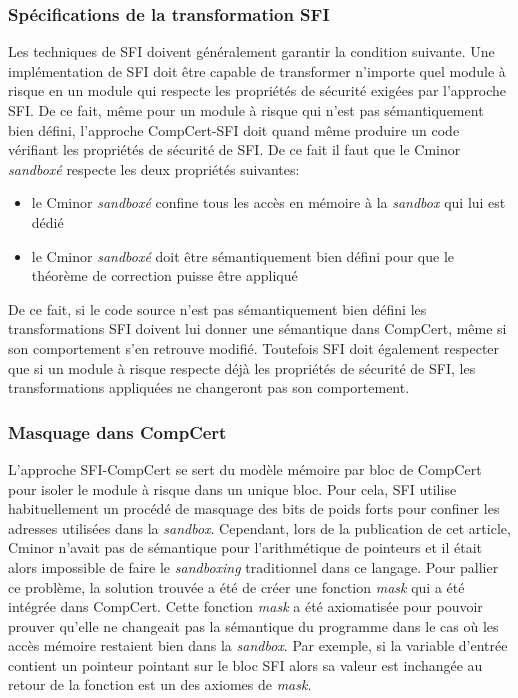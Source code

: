 \documentclass[11pt]{sdm}
\begin{document}
\subsubsection{Spécifications de la transformation SFI}

Les techniques de SFI doivent généralement garantir la condition suivante. Une implémentation de SFI doit être capable de transformer n'importe quel module à risque en un module qui respecte les propriétés de sécurité exigées par l'approche SFI. De ce fait, même pour un module à risque qui n'est pas sémantiquement bien défini, l'approche CompCert-SFI doit quand même produire un code vérifiant les propriétés de sécurité de SFI.
 De ce fait il faut que le Cminor \textit{sandboxé} respecte les deux propriétés suivantes:
\begin{itemize}
	\item le Cminor \textit{sandboxé} confine tous les accès en mémoire à la \textit{sandbox} qui lui est dédié
	\item le Cminor \textit{sandboxé} doit être sémantiquement bien défini pour que le théorème de correction puisse être appliqué
\end{itemize}

De ce fait, si le code source n'est pas sémantiquement bien défini les transformations SFI doivent lui donner une sémantique dans CompCert, même si son comportement s'en retrouve modifié. Toutefois SFI doit également respecter que si un module à risque respecte déjà les propriétés de sécurité de SFI, les transformations appliquées ne changeront pas son comportement.


\subsubsection{Masquage dans CompCert}

L'approche SFI-CompCert se sert du modèle mémoire par bloc de CompCert pour isoler le module à risque dans un unique bloc. Pour cela, SFI utilise habituellement un procédé de masquage des bits de poids forts pour confiner les adresses utilisées dans la \textit{sandbox}. Cependant, lors de la publication de cet article, Cminor n'avait pas de sémantique pour l'arithmétique de pointeurs et il était alors impossible de faire le \textit{sandboxing} traditionnel dans ce langage. Pour pallier ce problème, la solution trouvée a été de créer une fonction \textit{mask} qui a été intégrée dans CompCert. Cette fonction \textit{mask} a été axiomatisée pour pouvoir prouver qu'elle ne changeait pas la sémantique du programme dans le cas où les accès mémoire restaient bien dans la \textit{sandbox}. Par exemple, \og si la variable d'entrée contient un pointeur pointant sur le bloc SFI alors sa valeur est inchangée au retour de la fonction\fg{} est un des axiomes de \textit{mask}.
\end{document}
